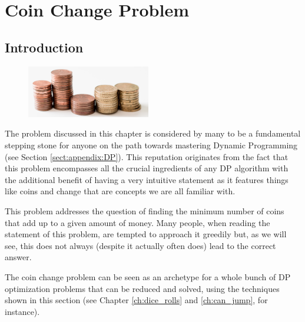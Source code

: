 %

\chapter{Coin Change Problem}
\label{ch:coin_change}
\section*{Introduction}

\begin{figure}
    \vspace{-20pt}
    \begin{center}
        \includegraphics[width=0.48\textwidth]{sources/coin_change/images/coin_stacks}
    \end{center}
    \vspace{-15pt}
  \end{figure}
The problem discussed in this chapter is considered by many to be a fundamental stepping stone for anyone on the path towards mastering Dynamic Programming (see Section \ref{sect:appendix:DP}).
This reputation originates from the fact that this problem encompasses all the crucial ingredients of any DP algorithm with the additional benefit of having a very intuitive statement as 
it features things like coins and change that are concepts we are all familiar with.

This problem addresses the question of finding the minimum number of coins that add up to a given amount of money. 
Many people, when reading the statement of this problem, are tempted to approach it greedily but, as we will see, this does not always (despite it actually often does) lead to the correct answer. 

The coin change problem can be seen as an archetype for a whole bunch of DP optimization problems that can be reduced and solved, using the techniques shown in this section (see Chapter \ref{ch:dice_rolls} and \ref{ch:can_jump}, for instance).


